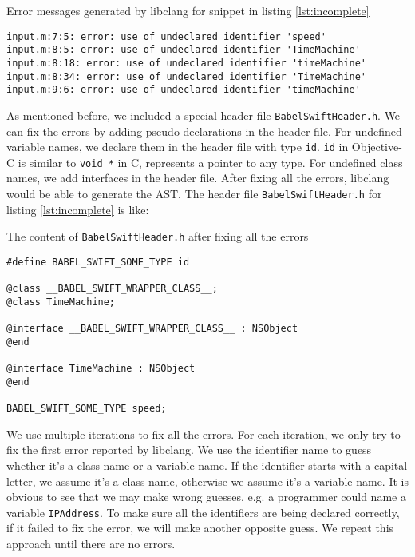 \documentclass{sfuthesis}
\begin{document}
\begin{listing}
\caption{Error messages generated by libclang for snippet in listing \ref{lst:incomplete}}
\begin{verbatim}
input.m:7:5: error: use of undeclared identifier 'speed'
input.m:8:5: error: use of undeclared identifier 'TimeMachine'
input.m:8:18: error: use of undeclared identifier 'timeMachine'
input.m:8:34: error: use of undeclared identifier 'TimeMachine'
input.m:9:6: error: use of undeclared identifier 'timeMachine'
\end{verbatim}
\end{listing}

As mentioned before, we included a special header file \texttt{BabelSwiftHeader.h}. We can fix the errors by adding pseudo-declarations in the header file. For undefined variable names, we declare them in the header file with type \texttt{id}. \texttt{id} in Objective-C is similar to \texttt{void *} in C, represents a pointer to any type. For undefined class names, we add interfaces in the header file. After fixing all the errors, libclang would be able to generate the AST. The header file \texttt{BabelSwiftHeader.h} for listing \ref{lst:incomplete} is like:

\begin{listing}
\caption{The content of \texttt{BabelSwiftHeader.h} after fixing all the errors}
\begin{verbatim}
#define BABEL_SWIFT_SOME_TYPE id

@class __BABEL_SWIFT_WRAPPER_CLASS__;
@class TimeMachine;

@interface __BABEL_SWIFT_WRAPPER_CLASS__ : NSObject
@end

@interface TimeMachine : NSObject
@end

BABEL_SWIFT_SOME_TYPE speed;
\end{verbatim}
\end{listing}

We use multiple iterations to fix all the errors. For each iteration, we only try to fix the first error reported by libclang. We use the identifier name to guess whether it's a class name or a variable name. If the identifier starts with a capital letter, we assume it's a class name, otherwise we assume it's a variable name. It is obvious to see that we may make wrong guesses, e.g. a programmer could name a variable \texttt{IPAddress}. To make sure all the identifiers are being declared correctly, if it failed to fix the error, we will make another opposite guess. We repeat this approach until there are no errors.
\end{document}
